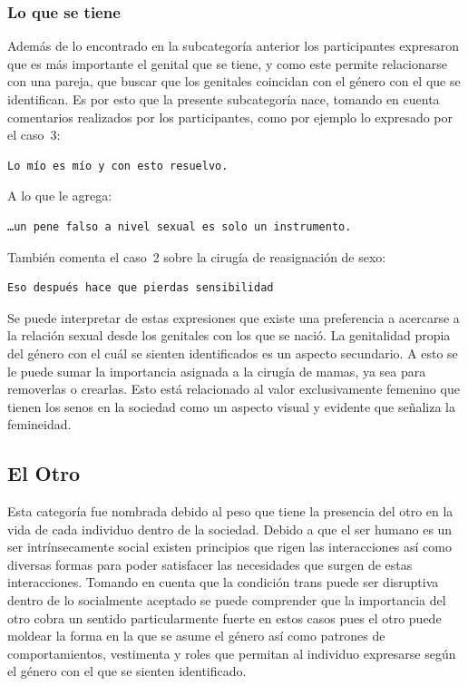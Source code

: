 \subsubsection{Lo que se tiene}

Además de lo encontrado en la subcategoría anterior los participantes expresaron
que es más importante el genital que se tiene, y como este permite relacionarse
con una pareja, que buscar que los genitales coincidan con el género con el que
se identifican. Es por esto que la presente subcategoría nace, tomando en cuenta
comentarios realizados por los participantes, como por ejemplo lo expresado por
el caso~3:

\begin{verbatim}
Lo mío es mío y con esto resuelvo.
\end{verbatim}

A lo que le agrega:

 \begin{verbatim}
…un pene falso a nivel sexual es solo un instrumento.
 \end{verbatim}

También comenta el caso~2 sobre la cirugía de reasignación de sexo:

\begin{verbatim}
Eso después hace que pierdas sensibilidad
\end{verbatim}

Se puede interpretar de estas expresiones que existe una preferencia a acercarse
a la relación sexual desde los genitales con los que se nació. La genitalidad
propia del género con el cuál se sienten identificados es un aspecto secundario.
A esto se le puede sumar la importancia asignada a la cirugía de mamas, ya sea
para removerlas o crearlas. Esto está relacionado al valor exclusivamente
femenino que tienen los senos en la sociedad como un aspecto visual y evidente
que señaliza la femineidad.

\subsection{El Otro}

Esta categoría fue nombrada debido al peso que tiene la presencia del otro en
la vida de cada individuo dentro de la sociedad. Debido a que el ser humano es
un ser intrínsecamente social existen principios que rigen las interacciones así
como diversas formas para poder satisfacer las necesidades que surgen de estas
interacciones. Tomando en cuenta que la condición trans puede ser disruptiva
dentro de lo socialmente aceptado se puede comprender que la importancia del
otro cobra un sentido particularmente fuerte en estos casos pues el otro puede
moldear la forma en la que se asume el género así como patrones de
comportamientos, vestimenta y roles que permitan al individuo expresarse según
el género con el que se sienten identificado.

